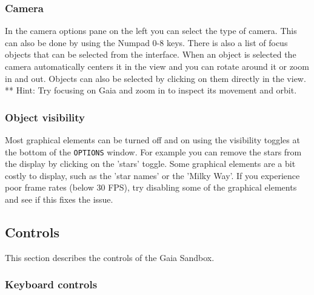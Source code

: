 \documentclass[
a4paper, %
11pt, %
onecolumn, %
openany, %
]{memoir}
\begin{document}
\subsubsection{Camera}
In the camera options pane on the left you can select the type of camera. 
This can also be done by using the Numpad 0-8 keys.
There is also a list of focus objects that can be selected from
the interface. When an object is selected the camera automatically centers
it in the view and you can rotate around it or zoom in and out.
Objects can also be selected by clicking on them directly in the view. \\
** Hint: Try focusing on Gaia and zoom in to inspect its movement and orbit.

\subsubsection{Object visibility}
Most graphical elements can be turned off and on using the visibility
toggles at the bottom of the \texttt{OPTIONS} window. For example you can remove
the stars from the display by clicking on the 'stars' toggle. Some 
graphical elements are a bit costly to display, such as the 'star names'
or the 'Milky Way'. If you experience poor frame rates (below 30 FPS), try
disabling some of the graphical elements and see if this fixes the issue.

\subsection{Controls}
This section describes the controls of the Gaia Sandbox.

\subsubsection{Keyboard controls}
\end{document}
